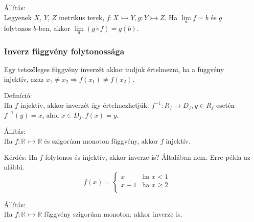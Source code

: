 \documentclass[12pt,a4paper]{scrartcl}
\newenvironment{definicio}{}{}
\newenvironment{allitas}{}{}
\begin{document}
\begin{enumerate}
\begin{allitas}
  Állítás:\\
  Legyenek \(X\), \(Y\), \(Z\) metrikus terek,
  \(\left. f:X\rightarrowtail Y,g:Y\rightarrowtail Z \right.\). Ha
  \(\underset{a}{\lim}f = b\) és \(g\) folytonos \(b\)-ben, akkor
  \(\underset{a}{\lim}\left( {g \circ f} \right) = g\left( b \right)\).

  \end{allitas}
\end{enumerate}

\hypertarget{inverz-fuggveny-folytonossaga}{%
\subsubsection{Inverz függvény
folytonossága}\label{inverz-fuggveny-folytonossaga}}

Egy tetszőleges függvény inverzét akkor tudjuk értelmezni, ha a függvény
injektív, azaz
\(\left. x_{1} \neq x_{2}\Rightarrow f\left( x_{1} \right) \neq f\left( x_{2} \right) \right.\).

\begin{definicio}

Definíció:\\
Ha \(f\) injektív, akkor inverzét így értelmezhetjük:
\(\left. f^{- 1}:R_{f}\rightarrow D_{f},y \in R_{f} \right.\) esetén
\(f^{- 1}\left( y \right) = x\), ahol
\(x \in D_{f},f\left( x \right) = y\).

\end{definicio}

\begin{allitas}

Állítás:\\
Ha \(\left. f:{\mathbb{R}}\rightarrowtail{\mathbb{R}} \right.\) és
szigorúan monoton függvény, akkor \(f\) injektív.

\end{allitas}

Kérdés: Ha \(f\) folytonos és injektív, akkor inverze is? Általában nem.
Erre példa az alábbi. \[f\left( x \right) = \begin{cases}
x & {\text{ha~}x < 1} \\
{x - 1} & {\text{ha~}x \geq 2} \\
\end{cases}\]

\begin{allitas}

Állítás:\\
Ha \(\left. f:{\mathbb{R}}\rightarrowtail{\mathbb{R}} \right.\) függvény
szigorúan monoton, akkor inverze is.

\end{allitas}
\end{document}
